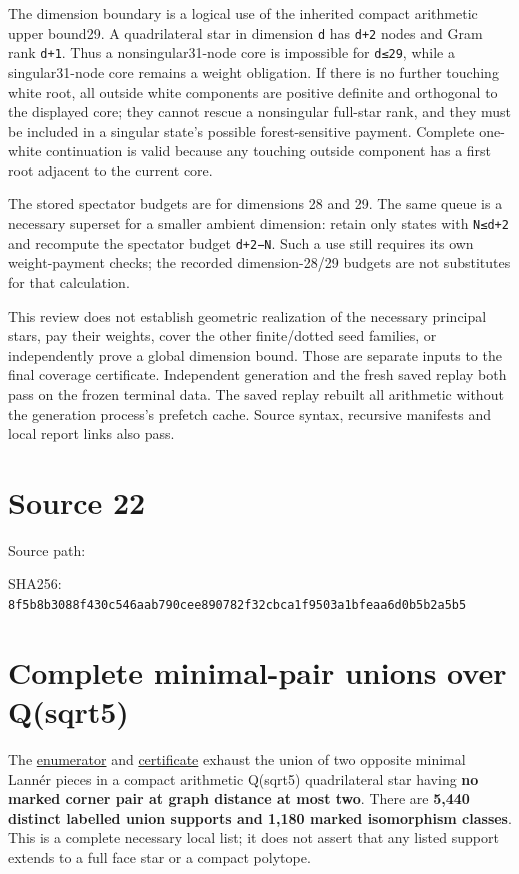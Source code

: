\documentclass[
  10pt,
]{report}
\begin{document}
The dimension boundary is a logical use of the inherited compact
arithmetic upper bound29. A quadrilateral star in dimension \texttt{d}
has \texttt{d+2} nodes and Gram rank \texttt{d+1}. Thus a
nonsingular31-node core is impossible for \texttt{d≤29}, while a
singular31-node core remains a weight obligation. If there is no further
touching white root, all outside white components are positive definite
and orthogonal to the displayed core; they cannot rescue a nonsingular
full-star rank, and they must be included in a singular state's possible
forest-sensitive payment. Complete one-white continuation is valid
because any touching outside component has a first root adjacent to the
current core.

The stored spectator budgets are for dimensions 28 and 29. The same
queue is a necessary superset for a smaller ambient dimension: retain
only states with \texttt{N≤d+2} and recompute the spectator budget
\texttt{d+2−N}. Such a use still requires its own weight-payment checks;
the recorded dimension-28/29 budgets are not substitutes for that
calculation.

This review does not establish geometric realization of the necessary
principal stars, pay their weights, cover the other finite/dotted seed
families, or independently prove a global dimension bound. Those are
separate inputs to the final coverage certificate. Independent
generation and the fresh saved replay both pass on the frozen terminal
data. The saved replay rebuilt all arithmetic without the generation
process's prefetch cache. Source syntax, recursive manifests and local
report links also pass.

\clearpage

\chapter{Source 22}\label{source-22}

Source path: 

SHA256:
\nolinkurl{8f5b8b3088f430c546aab790cee890782f32cbca1f9503a1bfeaa6d0b5b2a5b5}

\chapter{Complete minimal-pair unions over
Q(sqrt5)}\label{complete-minimal-pair-unions-over-qsqrt5}

The
\href{../scripts/fresh_sqrt5_quad_exhaustion_20261015.py}{enumerator}
and \href{fresh_sqrt5_quad_exhaustion_20261015.json}{certificate}
exhaust the union of two opposite minimal Lannér pieces in a compact
arithmetic Q(sqrt5) quadrilateral star having \textbf{no marked corner
pair at graph distance at most two}. There are \textbf{5,440 distinct
labelled union supports and 1,180 marked isomorphism classes}. This is a
complete necessary local list; it does not assert that any listed
support extends to a full face star or a compact polytope.
\end{document}
